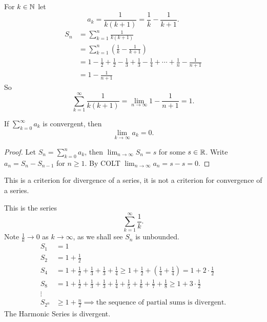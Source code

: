 \documentclass[10pt, a4paper]{article}
\newcommand{\infsum}[1][k = 1]{\sum_{#1}^{\infty}}
\begin{document}
\begin{example}
    For $k \in \mathbb{N}$ let
    \[
    a_k = \frac{1}{k(k + 1)} = \frac{1}{k} - \frac{1}{k + 1}.
    \]
    \begin{align*}
        S_n &= \sum_{k = 1}^{n}\frac{1}{k(k + 1)} \\
        &= \sum_{k = 1}^{n}\left(\frac{1}{k} - \frac{1}{k + 1}\right) \\
        &= 1 - \frac{1}{2} + \frac{1}{2} - \frac{1}{3} + \frac{1}{3} - \frac{1}{4} + \dotsi + \frac{1}{n} - \frac{1}{n + 1} \\
        &= 1 - \frac{1}{n + 1}
    \end{align*}
    So
    \[
    \infsum\frac{1}{k(k + 1)} = \lim_{n \rightarrow \infty}1 - \frac{1}{n + 1} = 1.
    \]
\end{example}

\begin{lemma}
    If $\infsum[k = 0]a_k$ is convergent,
    then
    \[
    \lim_{k \rightarrow \infty}a_k = 0.
    \]
    \begin{proof}
        Let $S_n = \sum_{k = 0}^{n}a_k$,
        then $\lim_{n \rightarrow \infty}S_n = s$ for some $s \in \mathbb{R}$.
        Write $a_n = S_n - S_{n - 1}$ for $n \geq 1$.
        By COLT $\lim_{n \rightarrow \infty}a_n = s - s = 0$.
    \end{proof}
\end{lemma}
This is a criterion for divergence of a series,
it is not a criterion for convergence of a series.

\begin{example}
    This is the series
    \[
    \infsum\frac{1}{k}.
    \]
    Note $\frac{1}{k} \rightarrow 0$ as $k \rightarrow \infty$,
    as we shall see $S_n$ is unbounded.
    \begin{align*}
    S_1 &= 1 \\
    S_2 &= 1 + \frac{1}{2} \\
    S_4 &= 1 + \frac{1}{2} + \frac{1}{3} + \frac{1}{3} + \frac{1}{4} \geq 1 + \frac{1}{2} + \left(\frac{1}{4} + \frac{1}{4}\right) = 1 + 2 \cdot \frac{1}{2} \\
    S_8 &= 1 + \frac{1}{2} + \frac{1}{3} + \frac{1}{3} + \frac{1}{4} + \frac{1}{5} + \frac{1}{6} + \frac{1}{7} + \frac{1}{8} \geq 1 + 3 \cdot \frac{1}{2} \\
    \vdots \\
    S_{2 ^ n} &\geq 1 + \frac{n}{2} \implies \text{the sequence of partial sums is divergent}.
    \end{align*}
    The Harmonic Series is divergent.
\end{example}
\end{document}
